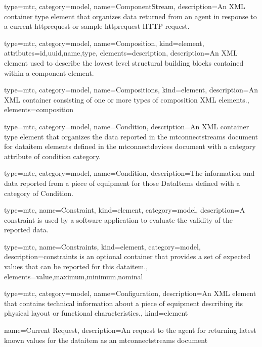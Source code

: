 {
  type=mtc,
  category=model,
  name={ComponentStream},
  description={An XML container type element that organizes data returned from an \gls{agent} in response to a \gls{current httprequest} or \gls{sample httprequest} HTTP request.} 
}


{
  type=mtc,
  category=model,
  name={Composition},
  kind={element},
  attributes={\gls{id},\gls{uuid},\gls{name},\gls{type}},
  elements={\gls{description}},
  description={An XML element used to describe the lowest level structural building blocks contained within a \gls{component} element.}
}


{
  type=mtc,
  category=model,
  name={Compositions},
  kind={element},
  description={An XML container consisting of one or more types of \gls{composition} XML elements.},
  elements={\gls{composition}}
}


{
  type=mtc,
  category=model,
  name={Condition},
  description={An XML container type element that organizes the data reported in the \gls{mtconnectstreams} document for \gls{dataitem} elements defined in the \gls{mtconnectdevices} document with a \gls{category} attribute of \gls{condition category}.}
}

{
  type=mtc,
  category=model,
  name={Condition},
  description={The information and data reported from a piece of equipment for those DataItems defined with a  category of Condition.}
}


{
  type=mtc,
  name={Constraint},
  kind={element},
  category=model,
  description={A \gls{constraint} is used by a software application to evaluate the validity of the reported data.}
}

{
  type=mtc,
  name={Constraints},
  kind={element},
  category=model,
  description={\gls{constraints} is an optional container that provides a set of expected values that can be reported for this \gls{dataitem}.},
  elements={\gls{value},\gls{maximum},\gls{minimum},\gls{nominal}}
}


{
  type=mtc,
  category=model,
  name={Configuration},
  description={An XML element that contains technical information about a piece of equipment describing its physical layout or functional characteristics.},
  kind={element}
}



{
  name={Current Request},
  description={An  request to the \gls{agent} for returning latest known values for the \gls{dataitem} as an \gls{mtconnectstreams}  document}
}


